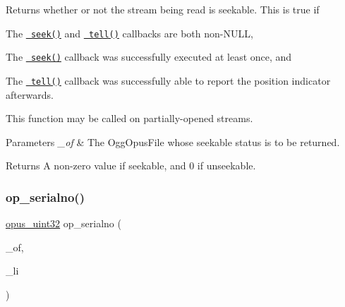 Returns whether or not the stream being read is seekable. This is true if 
\begin{DoxyEnumerate}
\item The {\ttfamily \href{\#op_seek_func}{\texttt{ seek()}}} and {\ttfamily \href{\#op_tell_func}{\texttt{ tell()}}} callbacks are both non-\/{\ttfamily N\+U\+LL}, 
\item The {\ttfamily \href{\#op_seek_func}{\texttt{ seek()}}} callback was successfully executed at least once, and 
\item The {\ttfamily \href{\#op_tell_func}{\texttt{ tell()}}} callback was successfully able to report the position indicator afterwards. 
\end{DoxyEnumerate}This function may be called on partially-\/opened streams. 
\begin{DoxyParams}{Parameters}
{\em \+\_\+of} & The {\ttfamily Ogg\+Opus\+File} whose seekable status is to be returned. \\
\hline
\end{DoxyParams}
\begin{DoxyReturn}{Returns}
A non-\/zero value if seekable, and 0 if unseekable. 
\end{DoxyReturn}
\mbox{\label{group__stream__info_ga41992ce6f066e07609e5fe2ccd961f40}} 
\subsubsection{\texorpdfstring{op\_serialno()}{op\_serialno()}}
{\footnotesize\ttfamily \mbox{\hyperlink{opus__types_8h_a643eaaadb9ef6cd44308e0299d8cd8ce}{opus\+\_\+uint32}} op\+\_\+serialno (\begin{DoxyParamCaption}\item[{const Ogg\+Opus\+File $\ast$}]{\+\_\+of,  }\item[{int}]{\+\_\+li }\end{DoxyParamCaption})}

